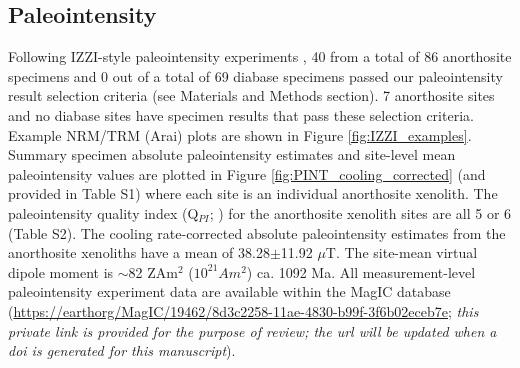 \documentclass[9pt,twocolumn,twoside,lineno]{pnas-new}
\begin{document}


\subsection*{Paleointensity}

Following IZZI-style paleointensity experiments \cite{Yu2004a}, 40 from a total of 86 anorthosite specimens and 0 out of a total of 69 diabase specimens passed our paleointensity result selection criteria (see Materials and Methods section). 7 anorthosite sites and no diabase sites have specimen results that pass these selection criteria. Example NRM/TRM (Arai) plots are shown in Figure \ref{fig:IZZI_examples}. Summary specimen absolute paleointensity estimates and site-level mean paleointensity values are plotted in Figure \ref{fig:PINT_cooling_corrected} (and provided in Table S1) where each site is an individual anorthosite xenolith. The paleointensity quality index (Q$_{PI}$; \citealp{Biggin2014a}) for the anorthosite xenolith sites are all 5 or 6 (Table S2). The cooling rate-corrected absolute paleointensity estimates from the anorthosite xenoliths have a mean of 38.28$\pm$11.92 $\mu$T. The site-mean virtual dipole moment is $\sim$82 ZAm$^2$ ($10^{21} Am^2$) ca. 1092 Ma. All measurement-level paleointensity experiment data are available within the MagIC database (\url{https://earthorg/MagIC/19462/8d3c2258-11ae-4830-b99f-3f6b02eceb7e}; \textit{this private link is provided for the purpose of review; the url will be updated when a doi is generated for this manuscript}). 
\end{document}
